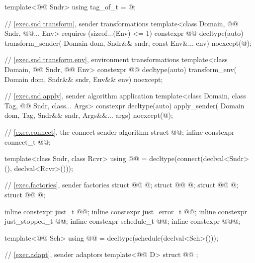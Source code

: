 \begin{codeblock}
{  template<@@ Sndr>
    using tag_of_t = @\seebelow@;

  // \ref{exec.snd.transform}, sender transformations
  template<class Domain, @@ Sndr, @@... Env>
      requires (sizeof...(Env) <= 1)
    constexpr @@ decltype(auto) transform_sender(
      Domain dom, Sndr&& sndr, const Env&... env) noexcept(@\seebelow@);

  // \ref{exec.snd.transform.env}, environment transformations
  template<class Domain, @@ Sndr, @@ Env>
    constexpr @@ decltype(auto) transform_env(
      Domain dom, Sndr&& sndr, Env&& env) noexcept;

  // \ref{exec.snd.apply}, sender algorithm application
  template<class Domain, class Tag, @@ Sndr, class... Args>
    constexpr decltype(auto) apply_sender(
      Domain dom, Tag, Sndr&& sndr, Args&&... args) noexcept(@\seebelow@);

  // \ref{exec.connect}, the connect sender algorithm
  struct @@;
  inline constexpr connect_t @@{};

  template<class Sndr, class Rcvr>
    using @@ =
      decltype(connect(declval<Sndr>(), declval<Rcvr>()));

  // \ref{exec.factories}, sender factories
  struct @@ { @\unspec@ };
  struct @@ { @\unspec@ };
  struct @@ { @\unspec@ };
  struct @@ { @\unspec@ };

  inline constexpr just_t @@{};
  inline constexpr just_error_t @@{};
  inline constexpr just_stopped_t @@{};
  inline constexpr schedule_t @@{};
  inline constexpr @\unspec@ @@{};

  template<@@ Sch>
    using @@ = decltype(schedule(declval<Sch>()));

  // \ref{exec.adapt}, sender adaptors
  template<@@ D>
    struct @@ { };

}
\end{codeblock}
